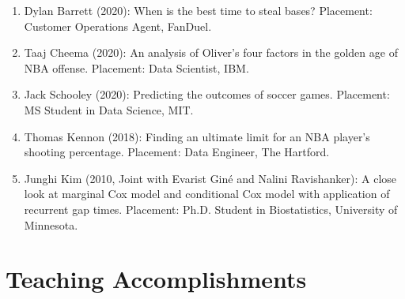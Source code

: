 \documentclass[Statistics]{vita}
\begin{document}
\begin{vita}
\begin{enumerate}
    \item Dylan Barrett (2020): When is the best time to steal bases? Placement: Customer Operations Agent, FanDuel.
    \item Taaj Cheema (2020): An analysis of Oliver’s four factors in the golden age of NBA offense. Placement: Data Scientist, IBM.
    \item Jack Schooley (2020): Predicting the outcomes of soccer games. Placement: MS Student in Data Science, MIT.
    \item Thomas Kennon (2018): Finding an ultimate limit for an NBA player's shooting percentage. Placement: Data Engineer, The Hartford.
    \item Junghi Kim (2010, Joint with Evarist Gin\'e and Nalini Ravishanker): A close look at marginal Cox model and conditional Cox model with application of recurrent gap times. Placement: Ph.D. Student in Biostatistics, University of Minnesota.
    \end{enumerate}
  \section{Teaching Accomplishments}

\end{vita}
\end{document}
